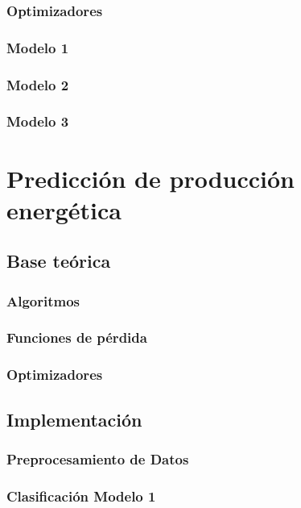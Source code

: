 \documentclass[a4paper,12pt]{article}
\begin{document}
\subsubsection{Optimizadores}

\subsubsection{Modelo 1}

\subsubsection{Modelo 2}

\subsubsection{Modelo 3}

\section{Predicción de producción energética}

\subsection{Base teórica}

\subsubsection{Algoritmos}

\subsubsection{Funciones de pérdida}

\subsubsection{Optimizadores}

\subsection{Implementación}

\subsubsection{Preprocesamiento de Datos}

\subsubsection{Clasificación Modelo 1}
\end{document}
